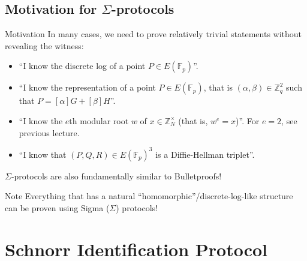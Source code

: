 \documentclass[xcolor={usenames,dvipsnames}]{beamer}
\begin{document}
    \subsection{Motivation for $\Sigma$-protocols}
    \begin{frame}{Motivation}
        In many cases, we need to prove relatively trivial statements without revealing the witness:
        \begin{itemize}
            \item ``I know the discrete log of a point $P \in E(\mathbb{F}_p)$''.\pause
            \item ``I know the representation of a point $P \in E(\mathbb{F}_p)$, that is $(\alpha,\beta) \in \mathbb{Z}_q^2$ such that $P=[\alpha]G + [\beta]H$''.\pause
            \item ``I know the $e$th modular root $w$ of $x \in \mathbb{Z}_N^{\times}$ (that is, $w^e=x$)''. \textcolor{blue!60!white}{For $e=2$, see previous lecture.}\pause
            \item ``I know that $(P,Q,R) \in E(\mathbb{F}_p)^3$ is a Diffie-Hellman triplet''.\pause
        \end{itemize}

        $\Sigma$-protocols are also fundamentally similar to Bulletproofs!\pause

        \begin{alertblock}{Note}
            Everything that has a natural ``homomorphic''/discrete-log-like structure can be proven using Sigma ($\Sigma$) protocols!
        \end{alertblock}
    \end{frame}

    \section{Schnorr Identification Protocol}
\end{document}
